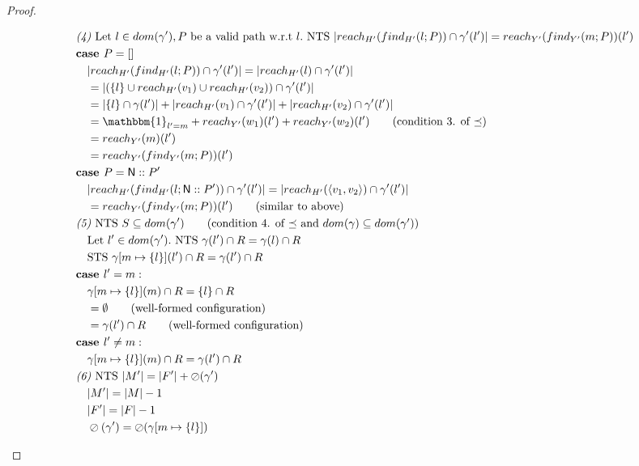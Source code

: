 \documentclass[11pt]{article}
\newcommand{\ms}[1]{\ensuremath{\mathsf{#1}}}
\newcommand{\oh}[1]{\oslash(#1)}
\theoremstyle{definition}
\begin{document}
\begin{proof}
\begin{description}
\begin{align*}
		&\emph{(4) } \text{Let } l \in dom(\gamma'), P \text{ be a valid path w.r.t } l. \text{ NTS }
		|reach_{H'}(find_{H'}(l;P)) \cap \gamma'(l')| = 
				reach_{Y'}(find_{Y'}(m;P))(l')\\
		&\textbf{case } P = []\\
		&\quad |reach_{H'}(find_{H'}(l;P)) \cap \gamma'(l')| = |reach_{H'}(l) \cap \gamma'(l')|\\
		&\quad = |(\{l\} \cup reach_{H'}(v_1) \cup reach_{H'}(v_2)) \cap \gamma'(l')|\\
		&\quad = |\{l\} \cap \gamma(l')| + |reach_{H'}(v_1) \cap \gamma'(l')| 
		+ |reach_{H'}(v_2) \cap \gamma'(l')| \\
		&\quad = \mathbbm{1}_{l' = m} + reach_{Y'}(w_1)(l') + reach_{Y'}(w_2)(l') 
			\tag{condition 3. of $\preceq$}\\
		&\quad = reach_{Y'}(m)(l')\\
		&\quad = reach_{Y'}(find_{Y'}(m;P))(l')\\
		&\textbf{case } P = \ms{N}::P'\\
		&\quad |reach_{H'}(find_{H'}(l;\ms{N}::P')) \cap \gamma'(l')| = 
			|reach_{H'}(\pairexcst{v_1}{v_2}) \cap \gamma'(l')|\\
		&\quad = reach_{Y'}(find_{Y'}(m;P))(l') \tag{similar to above}\\
		&\emph{(5) } \text{NTS } S \subseteq dom(\gamma') 
			\tag{condition 4. of $\preceq$ and $dom(\gamma) \subseteq dom(\gamma')$}\\
		&\quad\text{Let } l' \in dom(\gamma'). \text{ NTS } 
			\gamma(l') \cap R = \gamma(l) \cap R\\
		&\quad \text{STS } \gamma[m \mapsto \{l\}](l') \cap R = \gamma(l') \cap R\\
		&\textbf{case } l' = m:\\
		&\quad \gamma[m \mapsto \{l\}](m) \cap R = \{l\} \cap R\\
		&\quad = \emptyset \tag{well-formed configuration}\\
		&\quad = \gamma(l') \cap R \tag{well-formed configuration}\\
		&\textbf{case } l' \ne m:\\
		&\quad \gamma[m \mapsto \{l\}](m) \cap R = \gamma(l') \cap R\\
		&\emph{(6) } \text{NTS } |M'| = |F'| + \oh{\gamma'}\\
		&\quad |M'| = |M| - 1\\
		&\quad |F'| = |F| - 1\\
		&\quad \oh{\gamma'} = \oh{\gamma[m \mapsto \{l\}]}\\

\end{align*}
\end{description}
\end{proof}
\end{document}
